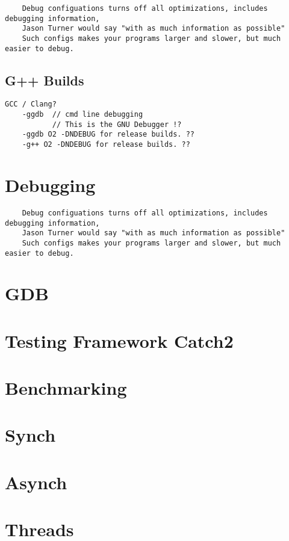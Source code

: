 \documentclass[openany]{report}
\begin{document}
\begin{verbatim}
    Debug configuations turns off all optimizations, includes debugging information,
    Jason Turner would say "with as much information as possible"
    Such configs makes your programs larger and slower, but much easier to debug. 
\end{verbatim}

\subsection{G++ Builds}
\begin{verbatim}
GCC / Clang? 
    -ggdb  // cmd line debugging
           // This is the GNU Debugger !?
    -ggdb O2 -DNDEBUG for release builds. ??
    -g++ O2 -DNDEBUG for release builds. ??
\end{verbatim}

\section{Debugging}

\begin{verbatim}
    Debug configuations turns off all optimizations, includes debugging information,
    Jason Turner would say "with as much information as possible"
    Such configs makes your programs larger and slower, but much easier to debug. 
\end{verbatim}

\section{GDB}
\section{Testing Framework Catch2}

\section{Benchmarking}

\section{Synch}
\section{Asynch}
\section{Threads}
\end{document}
